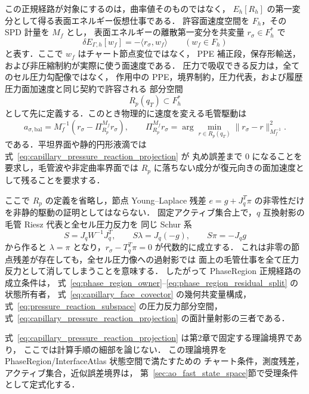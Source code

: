 この正規経路が対象にするのは，曲率値そのものではなく，
$E_h[R_h]$ の第一変分として得る表面エネルギー仮想仕事である．
許容面速度空間を $F_h$，その SPD 計量を $M_f$ とし，
表面エネルギーの離散第一変分を共変量 $r_\sigma\in F_h^\ast$ で
\begin{equation}
  \delta E_{\Gamma,h}[w_f]
  =
  -\langle r_\sigma,w_f\rangle
  \qquad (w_f\in F_h)
  \label{eq:capillary_face_covector}
\end{equation}
と表す．ここで $w_f$ はチャート節点変位ではなく，
PPE 補正段，保存形輸送，および非圧縮制約が実際に使う面速度である．
圧力で吸収できる反力は，全てのセル圧力勾配像ではなく，
作用中の PPE，境界制約，圧力代表，および履歴圧力面加速度と同じ契約で許容される
部分空間
\begin{equation}
  R_p(q_T)\subset F_h^\ast
  \label{eq:pressure_reaction_subspace}
\end{equation}
として先に定義する．このとき物理的に速度を変える毛管駆動は
\begin{equation}
  a_{\sigma,\mathrm{bal}}
  =
  M_f^{-1}\left(r_\sigma-\Pi_{R_p}^{M_f}r_\sigma\right),
  \qquad
  \Pi_{R_p}^{M_f}r_\sigma
  =
  \arg\min_{r\in R_p(q_T)}
  \|r_\sigma-r\|_{M_f^{-1}}^2 .
  \label{eq:capillary_pressure_reaction_projection}
\end{equation}
である．平坦界面や静的円形液滴では式~\eqref{eq:capillary_pressure_reaction_projection} が
丸め誤差まで 0 になることを要求し，毛管波や非定曲率界面では
$R_p$ に落ちない成分が復元向きの面加速度として残ることを要求する．

ここで $R_p$ の定義を省略し，節点 Young--Laplace 残差
$e=g+J_q^T\pi$ の非零性だけを非静的駆動の証明としてはならない．
固定アクティブ集合上で，$q$ 互換射影の毛管 Riesz 代表と全セル圧力反力を
同じ Schur 系
\begin{equation}
  S=J_qW^{-1}J_q^T,\qquad
  S\lambda=J_q(-g),\qquad
  S\pi=-J_qg
  \label{eq:ao_full_pressure_cancellation}
\end{equation}
から作ると $\lambda=\pi$ となり，$r_\sigma-T_q^T\pi=0$ が代数的に成立する．
これは非零の節点残差が存在しても，全セル圧力像への過射影では
面上の毛管仕事を全て圧力反力として消してしまうことを意味する．
したがって PhaseRegion 正規経路の成立条件は，
式~\eqref{eq:phase_region_owner}--\eqref{eq:phase_region_residual_split} の状態所有者，
式~\eqref{eq:capillary_face_covector} の幾何共変量構成，
式~\eqref{eq:pressure_reaction_subspace} の圧力反力部分空間，
式~\eqref{eq:capillary_pressure_reaction_projection} の面計量射影の三者である．

式~\eqref{eq:capillary_pressure_reaction_projection} は第2章で固定する理論境界であり，
ここでは計算手順の細部を論じない．
この理論境界を PhaseRegion/InterfaceAtlas 状態空間で満たすための
チャート条件，測度残差，アクティブ集合，近似誤差境界は，
第~\ref{sec:ao_fast_state_space}節で受理条件として定式化する．

